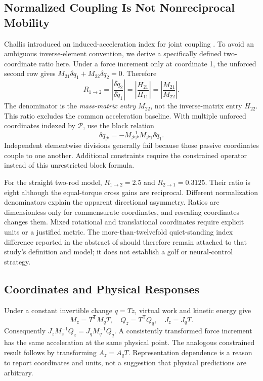 \subsection{Normalized Coupling Is Not Nonreciprocal Mobility}
Challis introduced an induced-acceleration index for joint coupling \citep{Challis2011}. To avoid an ambiguous inverse-element convention, we derive a specifically defined two-coordinate ratio here. Under a force increment only at coordinate 1, the unforced second row gives \(M_{21}\delta\ddot q_1+M_{22}\delta\ddot q_2=0\). Therefore
\begin{equation}
 R_{1\to2}=\left|\frac{\delta\ddot q_2}{\delta\ddot q_1}\right|
 =\left|\frac{H_{21}}{H_{11}}\right|
 =\left|\frac{M_{21}}{M_{22}}\right|.
 \label{eq:iai}
\end{equation}
The denominator is the \emph{mass-matrix entry} \(M_{22}\), not the inverse-matrix entry \(H_{22}\). This ratio excludes the common acceleration baseline. With multiple unforced coordinates indexed by \(\mathcal P\), use the block relation
\[
 \delta\ddot q_{\mathcal P}
 =-M_{\mathcal P\mathcal P}^{-1}M_{\mathcal P1}\delta\ddot q_1.
\]
Independent elementwise divisions generally fail because those passive coordinates couple to one another. Additional constraints require the constrained operator instead of this unrestricted block formula.

For the straight two-rod model, \(R_{1\to2}=2.5\) and \(R_{2\to1}=0.3125\). Their ratio is eight although the equal-torque cross gains are reciprocal. Different normalization denominators explain the apparent directional asymmetry. Ratios are dimensionless only for commensurate coordinates, and rescaling coordinates changes them. Mixed rotational and translational coordinates require explicit units or a justified metric. The more-than-twelvefold quiet-standing index difference reported in the abstract of \citep{Challis2011} should therefore remain attached to that study's definition and model; it does not establish a golf or neural-control strategy.

\subsection{Coordinates and Physical Responses}
Under a constant invertible change \(q=Tz\), virtual work and kinetic energy give
\[
 M_z=T^{\mathsf T}M_qT,\quad Q_z=T^{\mathsf T}Q_q,\quad J_z=J_qT.
\]
Consequently \(J_zM_z^{-1}Q_z=J_qM_q^{-1}Q_q\). A consistently transformed force increment has the same acceleration at the same physical point. The analogous constrained result follows by transforming \(A_z=A_qT\). Representation dependence is a reason to report coordinates and units, not a suggestion that physical predictions are arbitrary.

